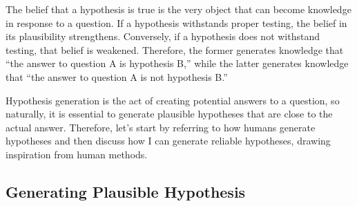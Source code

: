 The belief that a hypothesis is true is the very object that can become knowledge in response to a question. If a hypothesis withstands proper testing, the belief in its plausibility strengthens. Conversely, if a hypothesis does not withstand testing, that belief is weakened. Therefore, the former generates knowledge that ``the answer to question A is hypothesis B,'' while the latter generates knowledge that ``the answer to question A is not hypothesis B.'' 

Hypothesis generation is the act of creating potential answers to a question, so naturally, it is essential to generate plausible hypotheses that are close to the actual answer. Therefore, let's start by referring to how humans generate hypotheses and then discuss how I can generate reliable hypotheses, drawing inspiration from human methods.

\subsection{Generating Plausible Hypothesis}

